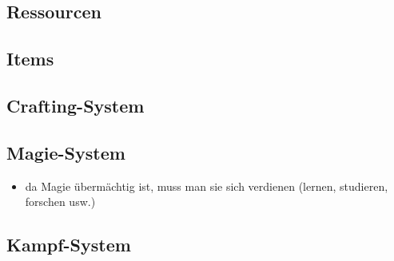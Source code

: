 
\subsection{Ressourcen}
\label{subsec:ressourcen}

\subsection{Items}
\label{subsec:items}

\subsection{Crafting-System}
\label{subsec:crafting-system}

\subsection{Magie-System}
\label{subsec:magie-system}
	\begin{itemize}
		\item da Magie übermächtig ist, muss man sie sich verdienen (lernen, studieren, forschen usw.)
	\end{itemize}

\subsection{Kampf-System}
\label{subsec:kamp-system}
